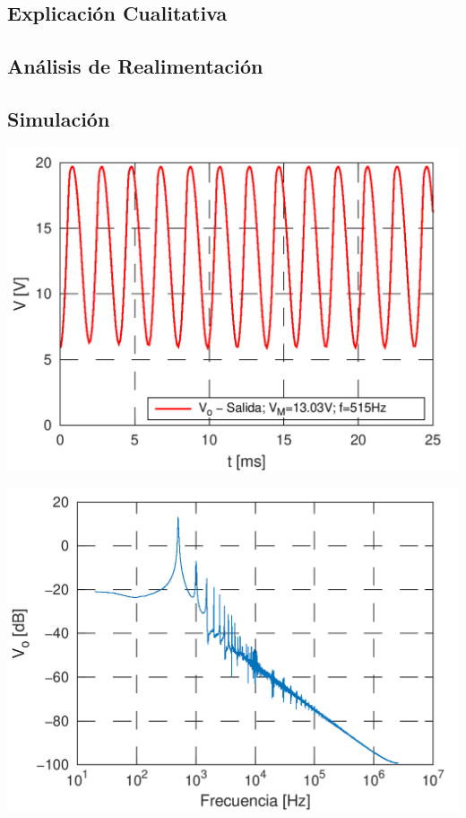 \begin{multicols}{2}
        \subsection{Explicación Cualitativa}

        \subsection{Análisis de Realimentación}

        \subsection{Simulación}

        \begin{center}
                   \includegraphics[width=\columnwidth]{salida_oscilador.png}
                   \label{fig:sim_out_oscilador}
        \end{center}

        \begin{center}
                   \includegraphics[width=\columnwidth]{fft_oscilador.png}
                   \label{fig:fft}
        \end{center}


\end{multicols}
